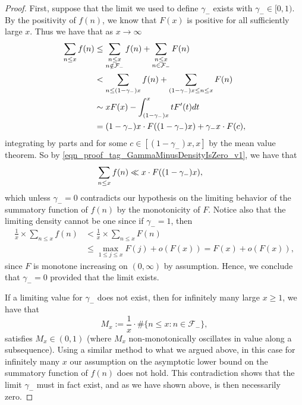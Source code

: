 \documentclass[11pt,reqno,a4letter]{article}
\numberwithin{figure}{section}
\numberwithin{table}{section}
\theoremstyle{plain}
\numberwithin{theorem}{section}
\theoremstyle{definition}
\begin{document}
\begin{proof} 
First, suppose that the limit we used to define $\gamma_{-}$ exists with $\gamma_{-} \in [0, 1)$. 
By the positivity of $f(n)$, we know that $F(x)$ is positive for all sufficiently large $x$. 
Thus we have that as $x \rightarrow \infty$ 
\begin{align} 
\notag 
\sum_{n \leq x} f(n) & \leq \sum_{\substack{n \leq x \\ n \notin \mathcal{F}_{-}}} f(n) + 
     \sum_{\substack{n \leq x \\ n \in \mathcal{F}_{-}}} F(n) \\ 
\notag 
     & < \sum_{n \leq (1-\gamma_{-}) x} f(n) + 
     \sum_{(1-\gamma_{-}) x \leq n \leq x} F(n) \\ 
\notag 
     & \sim 
     x F(x) - \int_{(1-\gamma_{-}) x}^{x} t F^{\prime}(t) dt \\ 
\label{eqn_proof_tag_GammaMinusDensityIsZero_v1} 
     & = (1-\gamma_{-}) x \cdot F((1-\gamma_{-}) x) + \gamma_{-} x \cdot F(c), 
\end{align} 
integrating by parts and for some $c \in [(1-\gamma_{-}) x, x]$ by the mean value theorem. 
So by \eqref{eqn_proof_tag_GammaMinusDensityIsZero_v1}, we have that 
\begin{align} 
\notag 
\sum_{n \leq x} f(n) & \ll x \cdot F((1-\gamma_{-}) x), 
\end{align} 
which unless $\gamma_{-} = 0$ contradicts our hypothesis on the limiting behavior 
of the summatory function of $f(n)$ by the monotonicity of $F$. 
Notice also that the limiting density cannot be one since if $\gamma_{-} = 1$, then 
\begin{align*} 
\frac{1}{x} \times \sum_{n \leq x} f(n) & < \frac{1}{x} \times \sum_{n \leq x} F(n) \\ 
     & \leq \max_{1 \leq j \leq x} F(j) + o(F(x)) = F(x) + o(F(x)), 
\end{align*} 
since $F$ is monotone increasing on $(0, \infty)$ by assumption. 
Hence, we conclude that $\gamma_{-} = 0$ provided that the limit exists. 

If a limiting value for $\gamma_{-}$ does not exist, then for infinitely many large $x \geq 1$, 
we have that 
\[
M_x := \frac{1}{x} \cdot \#\{n \leq x: n \in \mathcal{F}_{-}\}, 
\]
satisfies $M_x \in (0, 1)$ (where $M_x$ non-monotonically oscillates in value along a subsequence). 
Using a similar method to what we argued above, in this case for infinitely many $x$ 
our assumption on the asymptotic lower bound on 
the summatory function of $f(n)$ does not hold. This contradiction shows that the limit $\gamma_{-}$ 
must in fact exist, and as we have shown above, is then necessarily zero. 
\end{proof} 
\end{document}
